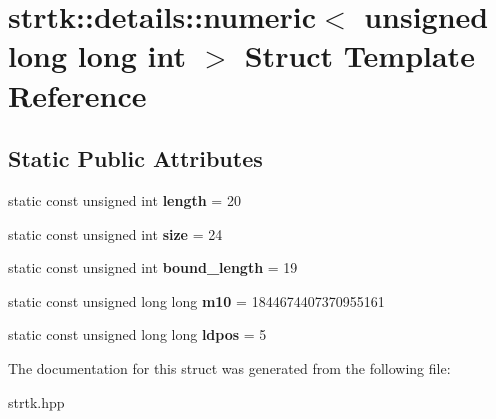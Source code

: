 \hypertarget{structstrtk_1_1details_1_1numeric_3_01unsigned_01long_01long_01int_01_4}{\section{strtk\-:\-:details\-:\-:numeric$<$ unsigned long long int $>$ Struct Template Reference}
\label{structstrtk_1_1details_1_1numeric_3_01unsigned_01long_01long_01int_01_4}
}
\subsection*{Static Public Attributes}
\begin{DoxyCompactItemize}
\item 
\hypertarget{structstrtk_1_1details_1_1numeric_3_01unsigned_01long_01long_01int_01_4_ae2717f870240f7300a6ab3356969cdc2}{static const unsigned int {\bfseries length} = 20}\label{structstrtk_1_1details_1_1numeric_3_01unsigned_01long_01long_01int_01_4_ae2717f870240f7300a6ab3356969cdc2}

\item 
\hypertarget{structstrtk_1_1details_1_1numeric_3_01unsigned_01long_01long_01int_01_4_a00af107b5ac2ffd88961f4d0e5cf9e15}{static const unsigned int {\bfseries size} = 24}\label{structstrtk_1_1details_1_1numeric_3_01unsigned_01long_01long_01int_01_4_a00af107b5ac2ffd88961f4d0e5cf9e15}

\item 
\hypertarget{structstrtk_1_1details_1_1numeric_3_01unsigned_01long_01long_01int_01_4_af70bce3fbc517d515078f7bd409015e7}{static const unsigned int {\bfseries bound\-\_\-length} = 19}\label{structstrtk_1_1details_1_1numeric_3_01unsigned_01long_01long_01int_01_4_af70bce3fbc517d515078f7bd409015e7}

\item 
\hypertarget{structstrtk_1_1details_1_1numeric_3_01unsigned_01long_01long_01int_01_4_a604d36f6ae1e4023b520a41112212d2d}{static const unsigned long long {\bfseries m10} = 1844674407370955161}\label{structstrtk_1_1details_1_1numeric_3_01unsigned_01long_01long_01int_01_4_a604d36f6ae1e4023b520a41112212d2d}

\item 
\hypertarget{structstrtk_1_1details_1_1numeric_3_01unsigned_01long_01long_01int_01_4_a91dcbe61ff4073a2af52b16e8af5bde0}{static const unsigned long long {\bfseries ldpos} = 5}\label{structstrtk_1_1details_1_1numeric_3_01unsigned_01long_01long_01int_01_4_a91dcbe61ff4073a2af52b16e8af5bde0}

\end{DoxyCompactItemize}


The documentation for this struct was generated from the following file\-:\begin{DoxyCompactItemize}
\item 
strtk.\-hpp\end{DoxyCompactItemize}
